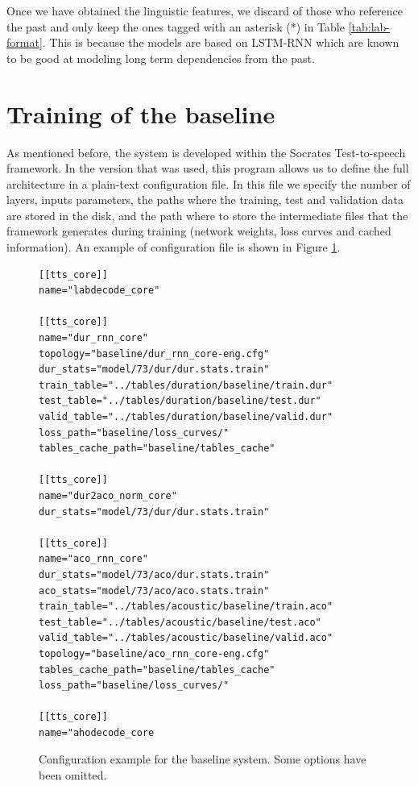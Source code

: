 Once we have obtained the linguistic features, we discard of those who reference the past and only keep the ones tagged with an asterisk ($*$) in Table \ref{tab:lab-format}. This is because the models are based on LSTM-RNN which are known to be good at modeling long term dependencies from the past\cite{hochreiter1997long}.

\section{Training of the baseline}

As mentioned before, the system is developed within the Socrates Test-to-speech framework. In the version that was used, this program allows us to define the full architecture in a plain-text configuration file. In this file we specify the number of layers, inputs parameters, the paths where the training, test and validation data are stored in the disk, and the path where to store the intermediate files that the framework generates during training (network weights, loss curves and cached information). An example of configuration file is shown in Figure \ref{fig:soc-conf}.

\begin{figure}[h]
    \begin{lstlisting}[basicstyle=\small,frame=single]
[[tts_core]]                                       
name="labdecode_core"

[[tts_core]]                                       
name="dur_rnn_core"                                
topology="baseline/dur_rnn_core-eng.cfg"           
dur_stats="model/73/dur/dur.stats.train"            
train_table="../tables/duration/baseline/train.dur"
test_table="../tables/duration/baseline/test.dur"  
valid_table="../tables/duration/baseline/valid.dur"
loss_path="baseline/loss_curves/"                  
tables_cache_path="baseline/tables_cache"          
                                                   
[[tts_core]]                                       
name="dur2aco_norm_core"                           
dur_stats="model/73/dur/dur.stats.train"

[[tts_core]]
name="aco_rnn_core"
dur_stats="model/73/aco/dur.stats.train"
aco_stats="model/73/aco/aco.stats.train"
train_table="../tables/acoustic/baseline/train.aco"
test_table="../tables/acoustic/baseline/test.aco"
valid_table="../tables/acoustic/baseline/valid.aco"
topology="baseline/aco_rnn_core-eng.cfg"
tables_cache_path="baseline/tables_cache"
loss_path="baseline/loss_curves/"

[[tts_core]]
name="ahodecode_core
    \end{lstlisting}
    \caption{Configuration example for the baseline system. Some options have been omitted.}
    \label{fig:soc-conf}
\end{figure}

